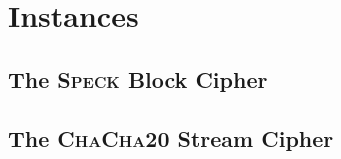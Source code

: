 \section{Instances}
\label{sec:instances}

\subsection{The \textsc{\textbf{Speck}} Block Cipher}

\lipsum[3]

\subsection{The \textbf{\textsc{ChaCha20}} Stream Cipher}

\lipsum[3]
